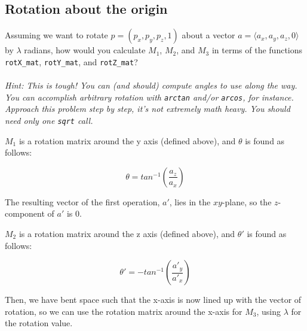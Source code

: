 \documentclass[10pt,twocolumn]{article}
\begin{document}
\subsection{Rotation about the origin}
\begin{framed}
\noindent{\bf [1.5 points]} Assuming we want to rotate $p=(p_x,p_y,p_z,1)$ about a vector $a = \langle a_x,a_y,a_z,0\rangle$ by $\lambda$ radians, how would you calculate $M_1$, $M_2$, and $M_3$ in terms of the functions {\tt rotX\_mat}, {\tt rotY\_mat}, and {\tt rotZ\_mat}?\\\\
\emph{Hint: This is tough! You can (and should) compute angles to use along the way. You can accomplish arbitrary rotation with {\tt arctan} and/or {\tt arcos}, for instance. Approach this problem step by step, it's not extremely math heavy. You should need only one {\tt sqrt} call.}
\end{framed}

\begin{framed}

$M_1$ is a rotation matrix around the y axis (defined above), and $\theta$ is found as follows:

$$\theta = tan^{-1}\left(\frac{a_z}{a_x}\right)$$

The resulting vector of the first operation, $a'$, lies in the $xy$-plane, so the $z$-component of $a'$ is 0.


$M_2$ is a rotation matrix around the z axis (defined above), and $\theta'$ is found as follows:

$$\theta' = -tan^{-1}\left(\frac{a'_y}{a'_x}\right)$$

Then, we have bent space such that the x-axis is now lined up with the vector of rotation, so we can use the rotation matrix around the x-axis for $M_3$, using $\lambda$ for the rotation value.










\end{framed}
\end{document}
